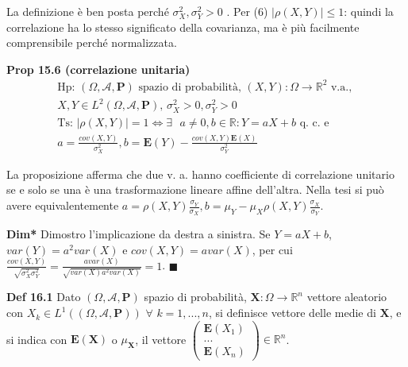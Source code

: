\documentclass{article}
\begin{document}
La definizione \`{e} ben posta perch\'{e} $\sigma _{X}^{2},\sigma _{Y}^{2}>0$%
. Per (6) $\left\vert \rho \left( X,Y\right) \right\vert \leq 1$: quindi la
correlazione ha lo stesso significato della covarianza, ma \`{e} pi\`{u}
facilmente comprensibile perch\'{e} normalizzata.

\textbf{Prop 15.6 (correlazione unitaria)}%
\begin{gather*}
\text{Hp}\text{: }\left( \Omega ,\mathcal{A},\mathbf{P}\right) \text{ spazio
di probabilit\`{a}, }\left( X,Y\right) :\Omega \rightarrow 
\mathbb{R}
^{2}\text{ v.a., } \\
X,Y\in L^{2}\left( \Omega ,\mathcal{A},\mathbf{P}\right) \text{, }\sigma
_{X}^{2}>0,\sigma _{Y}^{2}>0 \\
\text{Ts}\text{: }\left\vert \rho \left( X,Y\right) \right\vert
=1\Longleftrightarrow \exists \text{ }a\neq 0,b\in 
\mathbb{R}
:Y=aX+b\text{ q. c. e} \\
a=\frac{cov\left( X,Y\right) }{\sigma _{X}^{2}},b=\mathbf{E}\left( Y\right) -%
\frac{cov\left( X,Y\right) \mathbf{E}\left( X\right) }{\sigma _{Y}^{2}}
\end{gather*}

La proposizione afferma che due v. a. hanno coefficiente di correlazione
unitario se e solo se una \`{e} una trasformazione lineare affine
dell'altra. Nella tesi si pu\`{o} avere equivalentemente $a=\rho \left(
X,Y\right) \frac{\sigma _{Y}}{\sigma _{X}},b=\mu _{Y}-\mu _{X}\rho \left(
X,Y\right) \frac{\sigma _{X}}{\sigma _{Y}}$.

\textbf{Dim*} Dimostro l'implicazione da destra a sinistra. Se $Y=aX+b$, $%
var\left( Y\right) =a^{2}var\left( X\right) $ e $cov\left( X,Y\right)
=avar\left( X\right) $, per cui $\frac{cov\left( X,Y\right) }{\sqrt{\sigma
_{X}^{2}\sigma _{Y}^{2}}}=\frac{avar\left( X\right) }{\sqrt{var\left(
X\right) a^{2}var\left( X\right) }}=1$. $\blacksquare $

\textbf{Def 16.1} Dato $\left( \Omega ,\mathcal{A},\mathbf{P}\right) $
spazio di probabilit\`{a}, $\mathbf{X}:\Omega \rightarrow 
\mathbb{R}
^{n}$ vettore aleatorio con $X_{k}\in L^{1}\left( \left( \Omega ,\mathcal{A},%
\mathbf{P}\right) \right) $ $\forall $ $k=1,...,n$, si definisce vettore
delle medie di $\mathbf{X}$, e si indica con $\mathbf{E}\left( \mathbf{X}%
\right) $ o $\mu _{\mathbf{X}}$, il vettore $\left( 
\begin{array}{c}
\mathbf{E}\left( X_{1}\right) \\ 
... \\ 
\mathbf{E}\left( X_{n}\right)%
\end{array}%
\right) \in 
\mathbb{R}
^{n}$.
\end{document}
